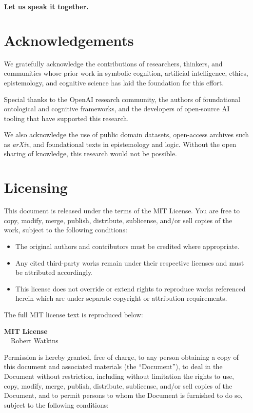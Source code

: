 \documentclass[twocolumn,10pt]{article}
\begin{document}
\textbf{Let us speak it together.}


\section*{Acknowledgements}
We gratefully acknowledge the contributions of researchers, thinkers, and communities whose prior work in symbolic cognition, artificial intelligence, ethics, epistemology, and cognitive science has laid the foundation for this effort. 

\newpage
Special thanks to the OpenAI research community, the authors of foundational ontological and cognitive frameworks, and the developers of open-source AI tooling that have supported this research.

We also acknowledge the use of public domain datasets, open-access archives such as \textit{arXiv}, and foundational texts in epistemology and logic. Without the open sharing of knowledge, this research would not be possible.

\section*{Licensing}
This document is released under the terms of the MIT License. You are free to copy, modify, merge, publish, distribute, sublicense, and/or sell copies of the work, subject to the following conditions:

\begin{itemize}
  \item The original authors and contributors must be credited where appropriate.
  \item Any cited third-party works remain under their respective licenses and must be attributed accordingly.
  \item This license does not override or extend rights to reproduce works referenced herein which are under separate copyright or attribution requirements.
\end{itemize}

The full MIT license text is reproduced below:

\textbf{MIT License}\\
\small
\textcopyright\ \the\year\ Robert Watkins

Permission is hereby granted, free of charge, to any person obtaining a copy of this document and associated materials (the “Document”), to deal in the Document without restriction, including without limitation the rights to use, copy, modify, merge, publish, distribute, sublicense, and/or sell copies of the Document, and to permit persons to whom the Document is furnished to do so, subject to the following conditions:
\end{document}
